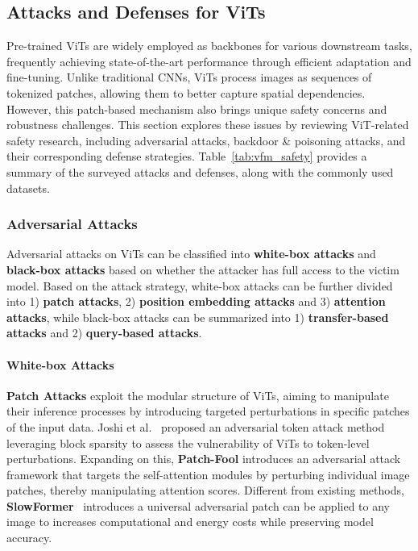 \subsection{Attacks and Defenses for ViTs}\label{sec:vfm_vit}
Pre-trained ViTs are widely employed as backbones for various downstream tasks, frequently achieving state-of-the-art performance through efficient adaptation and fine-tuning. Unlike traditional CNNs, ViTs process images as sequences of tokenized patches, allowing them to better capture spatial dependencies. However, this patch-based mechanism also brings unique safety concerns and robustness challenges. This section explores these issues by reviewing ViT-related safety research, including adversarial attacks, backdoor \& poisoning attacks, and their corresponding defense strategies.  Table~\ref{tab:vfm_safety} provides a summary of the surveyed attacks and defenses, along with the commonly used datasets.


\subsubsection{Adversarial Attacks}\label{sec:ViT-adv}
Adversarial attacks on ViTs can be classified into \textbf{white-box attacks} and \textbf{black-box attacks} based on whether the attacker has full access to the victim model. Based on the attack strategy, white-box attacks can be further divided into 1) \textbf{patch attacks}, 2) \textbf{position embedding attacks} and 3) \textbf{attention attacks}, while black-box attacks can be summarized into 1) \textbf{transfer-based attacks} and 2) \textbf{query-based attacks}.

\paragraph{White-box Attacks}
\textbf{Patch Attacks} exploit the modular structure of ViTs, aiming to manipulate their inference processes by introducing targeted perturbations in specific patches of the input data. Joshi et al.~\cite{joshi2021adversarial} proposed an adversarial token attack method leveraging block sparsity to assess the vulnerability of ViTs to token-level perturbations. 
Expanding on this, \textbf{Patch-Fool}\cite{fu2022patch} introduces an adversarial attack framework that targets the self-attention modules by perturbing individual image patches, thereby manipulating attention scores.
Different from existing methods, \textbf{SlowFormer}~\cite{navaneet2024slowformer} introduces a universal adversarial patch can be applied to any image to increases computational and energy costs while preserving model accuracy.


